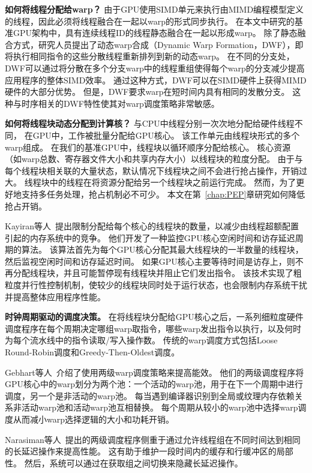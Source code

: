 \textbf{如何将线程分配给warp？}
由于GPU使用SIMD单元来执行由MIMD编程模型定义的线程，因此必须将线程融合在一起以warp的形式同步执行。 
在本文中研究的基准GPU架构中，具有连续线程ID的线程静态融合在一起以形成warp。 
除了静态融合方式，研究人员提出了动态warp合成（Dynamic Warp Formation，DWF），即将执行相同指令的这些分散线程重新排列到新的动态warp。 
在不同的分支处，DWF可以通过将分散在多个分支warp中的线程重组使得每个warp的分支减少提高应用程序的整体SIMD效率。 
通过这种方式，DWF可以在SIMD硬件上获得MIMD硬件的大部分优势。 
但是，DWF要求warp在短时间内具有相同的发散分支。 
这种与时序相关的DWF特性使其对warp调度策略非常敏感。

\textbf{如何将线程块动态分配到计算核？}
与CPU中线程分别一次次地分配给硬件线程不同，
在GPU中，工作被批量分配给GPU核心。 
该工作单元由线程块形式的多个warp组成。 
在我们的基准GPU中，线程块以循环顺序分配给核心。 
核心资源（如warp总数、寄存器文件大小和共享内存大小）以线程块的粒度分配。 
由于与每个线程块相关联的大量状态，默认情况下线程块之间不会进行抢占操作，开销过大。
线程块中的线程在将资源分配给另一个线程块之前运行完成。
然而，为了更好地支持多任务处理，抢占机制必不可少。
本文在第~\ref{chap:PEP}章研究如何降低抢占开销。

Kayiran等人~提出限制分配给每个核心的线程块的数量，以减少由线程超额配置引起的内存系统中的竞争。 
他们开发了一种监控GPU核心空闲时间和访存延迟周期的算法。 
该算法首先为每个GPU核心分配其最大线程块的一半数量的线程块，然后监视空闲时间和访存延迟时间。 
如果GPU核心主要等待时间是访存上，则不再分配线程块，并且可能暂停现有线程块并阻止它们发出指令。 
该技术实现了粗粒度并行性控制机制，使较少的线程块同时处于运行状态，也会限制内存系统干扰并提高整体应用程序性能。

\textbf{时钟周期驱动的调度决策。}
在将线程块分配给GPU核心之后，一系列细粒度硬件调度程序在每个周期决定哪组warp取指令，哪些warp发出指令以执行，以及何时为每个流水线中的指令读取/写入操作数。
传统的warp调度方式包括Loose Round-Robin调度和Greedy-Then-Oldest调度。

Gebhart等人~介绍了使用两级warp调度策略来提高能效。
他们的两级调度程序将GPU核心中的warp划分为两个池：一个活动的warp池，用于在下一个周期中进行调度，另一个是非活动的warp池。
每当遇到编译器识别到全局或纹理内存依赖关系非活动warp池和活动warp池互相替换。
每个周期从较小的warp池中选择warp调度从而减小warp选择逻辑的大小和功耗开销。 

Narasiman等人~提出的两级调度程序侧重于通过允许线程组在不同时间达到相同的长延迟操作来提高性能。
这有助于维护一段时间内的缓存和行缓冲区的局部性。
然后，系统可以通过在获取组之间切换来隐藏长延迟操作。

